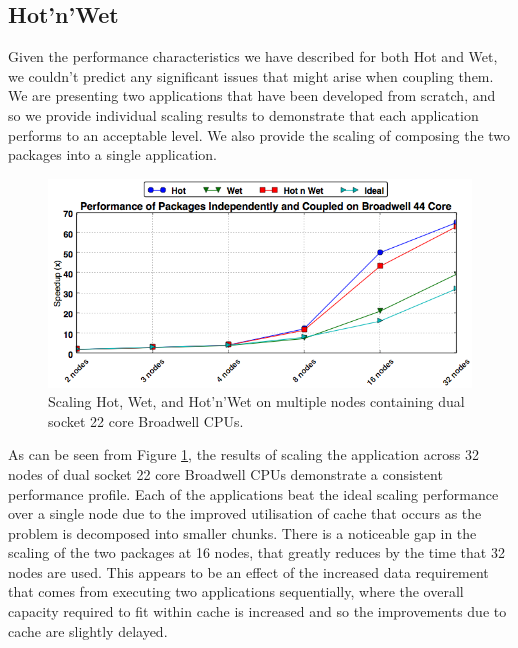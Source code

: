 \documentclass[runningheads,a4paper]{llncs}
\begin{document}
\subsection{Hot'n'Wet}

Given the performance characteristics we have described for both Hot and Wet, we couldn't predict any significant issues that might arise when coupling them. We are presenting two applications that have been developed from scratch, and so we provide individual scaling results to demonstrate that each application performs to an acceptable level. We also provide the scaling of composing the two packages into a single application.

\begin{figure}
  \centering
  \includegraphics[width=1.0\linewidth]{cpu_results}
  \caption{Scaling Hot, Wet, and Hot'n'Wet on multiple nodes containing dual socket 22 core Broadwell CPUs.}
  \label{fig:scaling-hot-wet-broadwell}
\end{figure}

As can be seen from Figure \ref{fig:scaling-hot-wet-broadwell}, the results of scaling the application across 32 nodes of dual socket 22 core Broadwell CPUs demonstrate a consistent performance profile. Each of the applications beat the ideal scaling performance over a single node due to the improved utilisation of cache that occurs as the problem is decomposed into smaller chunks. There is a noticeable gap in the scaling of the two packages at 16 nodes, that greatly reduces by the time that 32 nodes are used. This appears to be an effect of the increased data requirement that comes from executing two applications sequentially, where the overall capacity required to fit within cache is increased and so the improvements due to cache are slightly delayed.
\end{document}
